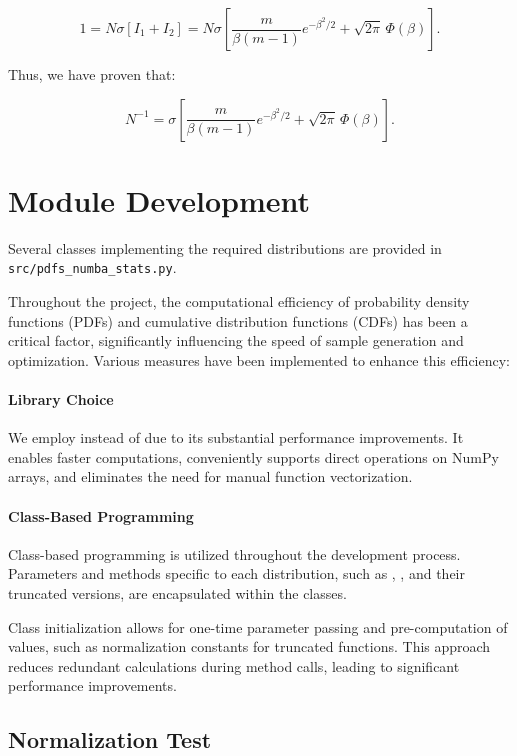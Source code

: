 \documentclass{article}
\begin{document}
$$
1 = N \sigma [I_1 + I_2] = N \sigma \left[ \frac{m}{\beta(m-1)} e^{-\beta^2/2} + \sqrt{2\pi} \,\Phi(\beta) \right].
$$

Thus, we have proven that:

$$
N^{-1} = \sigma \left[ \frac{m}{\beta(m - 1)} e^{-\beta^2/2} + \sqrt{2\pi}\,\Phi(\beta) \right].
$$

\section{Module Development}

Several classes implementing the required distributions are provided in \texttt{src/pdfs\_numba\_stats.py}. 

Throughout the project, the computational efficiency of probability density functions (PDFs) and cumulative distribution functions (CDFs) has been a critical factor, significantly influencing the speed of sample generation and optimization. Various measures have been implemented to enhance this efficiency:

\paragraph{Library Choice} 
We employ \cite{hans_dembinski_2024_13236518} instead of  due to its substantial performance improvements. It enables faster computations, conveniently supports direct operations on NumPy arrays, and eliminates the need for manual function vectorization.

\paragraph{Class-Based Programming}
Class-based programming is utilized throughout the development process. Parameters and methods specific to each distribution, such as , , and their truncated versions, are encapsulated within the classes.

Class initialization allows for one-time parameter passing and pre-computation of values, such as normalization constants for truncated functions. This approach reduces redundant calculations during method calls, leading to significant performance improvements.


\subsection{Normalization Test}
\end{document}
